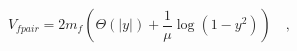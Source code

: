 \begin{equation}
V_{fpair} = 2m_f \left(\Theta\left(|y|\right)+ \frac{1}{\mu} \log\left(1-y^2\right)\right)\quad,
\label{SymVNeedle}
\end{equation}

